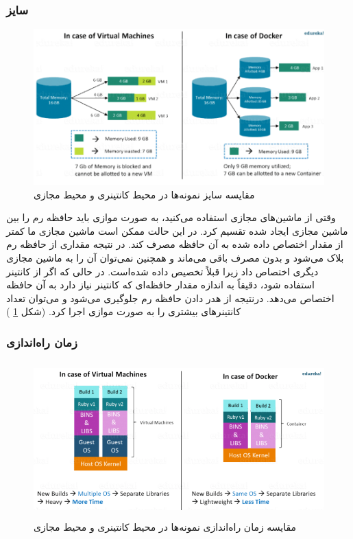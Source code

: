 \subsubsection*{سایز}


\begin{figure}[!h]
	\centering
	\includegraphics[width=\linewidth]{fig2-2}
	\caption{مقایسه سایز نمونه‌ها در محیط کانتینری و محیط مجازی}
	\label{تصویر 2-2}
\end{figure}

وقتی از ماشین‌های مجازی استفاده می‌کنید، به صورت موازی باید حافظه رم را بین ماشین مجازی ایجاد شده تقسیم کرد. در این حالت ممکن است ماشین مجازی ما کمتر از مقدار اختصاص داده شده به آن حافظه مصرف کند. در نتیجه مقداری از حافظه رم بلاک می‌شود و بدون مصرف باقی می‌ماند و همچنین نمی‌توان آن را به ماشین مجازی دیگری اختصاص داد زیرا قبلاً تخصیص داده شده‌است. در حالی که اگر از کانتینر استفاده شود،
دقیقاً به اندازه مقدار حافظه‌ای که کانتینر نیاز دارد به آن حافظه اختصاص می‌دهد. درنتیجه از هدر دادن حافظه رم جلوگیری می‌شود و می‌توان تعداد کانتینرهای بیشتری را به صورت موازی اجرا کرد. (‌شکل 
\ref{تصویر 2-2}
)

\subsubsection*{زمان راه‌اندازی}

\begin{figure}[!h]
	\centering
	\includegraphics[height=6cm]{fig2-3}
	\caption{مقایسه زمان راه‌اندازی نمونه‌ها در محیط کانتینری و محیط مجازی}
	\label{تصویر 2-3}
\end{figure}

